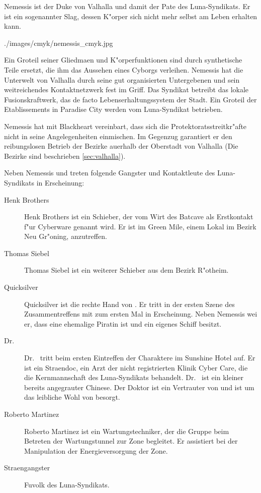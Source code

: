 
Nemessis ist der Duke von Valhalla und damit der Pate des Luna-Syndikats. Er ist ein sogenannter Slag, dessen K"orper sich nicht mehr selbst am Leben erhalten kann.

\begin{sideimagebox}[r]{0.98}{./images/cmyk/nemessis_cmyk.jpg}{}
\end{sideimagebox}

Ein Gro\3teil seiner Gliedma\3en und K"orperfunktionen sind durch synthetische Teile ersetzt, die ihm das Aussehen eines Cyborgs verleihen. Nemessis hat die Unterwelt von Valhalla durch seine gut organisierten Untergebenen und sein weitreichendes Kontaktnetzwerk fest im Griff. Das Syndikat betreibt das lokale Fusionskraftwerk, das de facto Lebenserhaltungssystem der Stadt. Ein Gro\3teil der Etablissements in Paradise City werden vom Luna-Syndikat betrieben. 

Nemessis hat mit Blackheart vereinbart, dass sich die Protektoratsstreitkr"afte nicht in seine Angelegenheiten einmischen. Im Gegenzug garantiert er den reibungslosen Betrieb der Bezirke au\3erhalb der Oberstadt von Valhalla (Die Bezirke sind beschrieben \cref{sec:valhalla}).


Neben Nemessis und \xl{} treten folgende Gangster und Kontaktleute des Luna-Syndikats in Erscheinung:

\begin{description}
    \item [Henk Brothers] Henk Brothers ist ein Schieber, der vom Wirt des Batcave als Erstkontakt f"ur Cyberware genannt wird. Er ist im 
        Green Mile, einem Lokal im Bezirk Neu Gr"oning, anzutreffen.
    \item [Thomas Siebel] Thomas Siebel ist ein weiterer Schieber aus dem Bezirk R"otheim.
    \item [Quicksilver] Quicksilver ist die rechte Hand von \xl{}. Er tritt in der ersten Szene des Zusammentreffens mit \xl{} zum ersten   
        Mal in Erscheinung. Neben Nemessis wei\3 er, dass \xl{} eine ehemalige Piratin ist und ein eigenes Schiff besitzt.
    \item [Dr.~ ] Dr.~  tritt beim ersten Eintreffen der Charaktere im Sunshine Hotel auf. 
        Er ist ein Stra\3endoc, ein Arzt der nicht registrierten Klinik  Cyber Care, die die Kernmannschaft des Luna-Syndikats behandelt. Dr.~  ist ein kleiner bereits angegrauter Chinese. Der Doktor ist ein Vertrauter von \xl{} und ist um das leibliche Wohl von \xl{} besorgt.
    \item [Roberto Martinez] Roberto Martinez ist ein Wartungstechniker, der die Gruppe beim Betreten der Wartungstunnel zur Zone 
        begleitet. Er assistiert \xl{} bei der Manipulation der Energieversorgung der Zone.
    \item [Stra\3engangster] Fu\3volk des Luna-Syndikats.  
\end{description}

